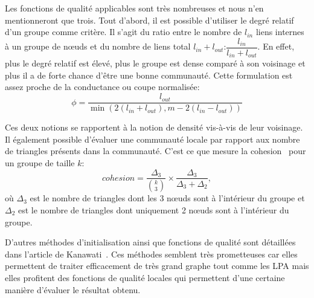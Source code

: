 Les fonctions de qualité applicables sont très nombreuses et nous n'en mentionneront que trois.
Tout d'abord, il est possible d'utiliser le degré relatif~\cite{Luo2008} d'un groupe comme critère.
Il s'agit du ratio entre le nombre de $l_{in}$ liens internes à un groupe de n\oe uds et du nombre de liens total $l_{in}+l_{out}$:$ \dfrac{l_{in}}{l_{in}+l_{out}}$.
En effet, plus le degré relatif est élevé, plus le groupe est dense comparé à son voisinage et plus il a de forte chance d'être une bonne communauté. 
Cette formulation est assez proche de la conductance ou coupe normalisée\cite{Shi2000}:
\begin{equation}
\phi =\dfrac{l_{out}}{\min \left( 2(l_{in}+l_{out}),m-2(l_{in}-l_{out}) \right) }
\end{equation}

Ces deux notions se rapportent à la notion de densité vis-à-vis de leur voisinage.
Il également possible d'évaluer une communauté locale par rapport aux nombre de triangles présents dans la communauté.
C'est ce que mesure la cohesion~\cite{Friggeri2011} pour un groupe de taille $k$: 
\begin{equation}
cohesion=\dfrac{\Delta_3}{ {k \choose 3} } \times \frac{\Delta_3}{\Delta_3+\Delta_2},
\end{equation}
où $\Delta_3$ est le nombre de triangles dont les 3 n\oe uds sont à l'intérieur du groupe et $\Delta_2$ est le nombre de triangles dont uniquement 2 n\oe uds sont à l'intérieur du groupe.

D'autres méthodes d'initialisation ainsi que fonctions de qualité sont détaillées dans l'article de Kanawati~\cite{Kanawati2014}.
Ces méthodes semblent très prometteuses car elles permettent de traiter efficacement de très grand graphe tout comme les LPA mais elles profitent des fonctions de qualité locales qui permettent d'une certaine manière d'évaluer le résultat obtenu.





